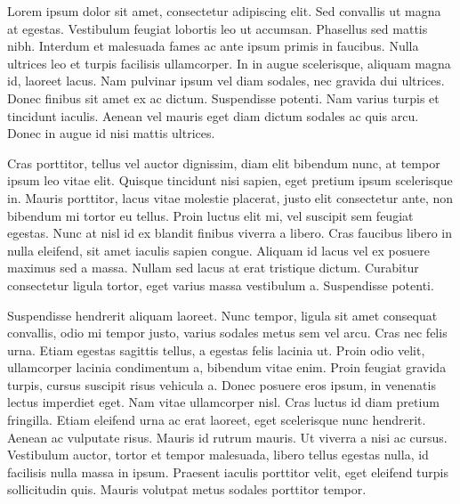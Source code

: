  Lorem ipsum dolor sit amet, consectetur adipiscing elit. Sed convallis ut magna at egestas. Vestibulum feugiat lobortis leo ut accumsan. Phasellus sed mattis nibh. Interdum et malesuada fames ac ante ipsum primis in faucibus. Nulla ultrices leo et turpis facilisis ullamcorper. In in augue scelerisque, aliquam magna id, laoreet lacus. Nam pulvinar ipsum vel diam sodales, nec gravida dui ultrices. Donec finibus sit amet ex ac dictum. Suspendisse potenti. Nam varius turpis et tincidunt iaculis. Aenean vel mauris eget diam dictum sodales ac quis arcu. Donec in augue id nisi mattis ultrices.
 
 Cras porttitor, tellus vel auctor dignissim, diam elit bibendum nunc, at tempor ipsum leo vitae elit. Quisque tincidunt nisi sapien, eget pretium ipsum scelerisque in. Mauris porttitor, lacus vitae molestie placerat, justo elit consectetur ante, non bibendum mi tortor eu tellus. Proin luctus elit mi, vel suscipit sem feugiat egestas. Nunc at nisl id ex blandit finibus viverra a libero. Cras faucibus libero in nulla eleifend, sit amet iaculis sapien congue. Aliquam id lacus vel ex posuere maximus sed a massa. Nullam sed lacus at erat tristique dictum. Curabitur consectetur ligula tortor, eget varius massa vestibulum a. Suspendisse potenti.
 
 Suspendisse hendrerit aliquam laoreet. Nunc tempor, ligula sit amet consequat convallis, odio mi tempor justo, varius sodales metus sem vel arcu. Cras nec felis urna. Etiam egestas sagittis tellus, a egestas felis lacinia ut. Proin odio velit, ullamcorper lacinia condimentum a, bibendum vitae enim. Proin feugiat gravida turpis, cursus suscipit risus vehicula a. Donec posuere eros ipsum, in venenatis lectus imperdiet eget. Nam vitae ullamcorper nisl. Cras luctus id diam pretium fringilla. Etiam eleifend urna ac erat laoreet, eget scelerisque nunc hendrerit. Aenean ac vulputate risus. Mauris id rutrum mauris. Ut viverra a nisi ac cursus. Vestibulum auctor, tortor et tempor malesuada, libero tellus egestas nulla, id facilisis nulla massa in ipsum. Praesent iaculis porttitor velit, eget eleifend turpis sollicitudin quis. Mauris volutpat metus sodales porttitor tempor. 
